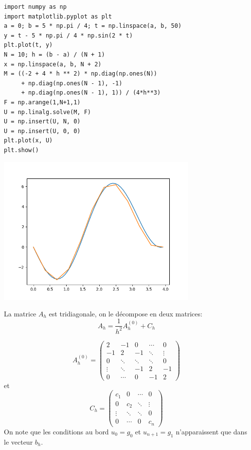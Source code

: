 \documentclass{beamer}
\begin{document}
 \begin{frame}[fragile] 
\begin{verbatim}
import numpy as np
import matplotlib.pyplot as plt
a = 0; b = 5 * np.pi / 4; t = np.linspace(a, b, 50)
y = t - 5 * np.pi / 4 * np.sin(2 * t)
plt.plot(t, y)
N = 10; h = (b - a) / (N + 1)
x = np.linspace(a, b, N + 2)
M = ((-2 + 4 * h ** 2) * np.diag(np.ones(N))
     + np.diag(np.ones(N - 1), -1)
     + np.diag(np.ones(N - 1), 1)) / (4*h**3)
F = np.arange(1,N+1,1)
U = np.linalg.solve(M, F)
U = np.insert(U, N, 0)
U = np.insert(U, 0, 0)
plt.plot(x, U)
plt.show()
\end{verbatim}
 
 \end{frame}
 
 \begin{frame} 
  \begin{center}
\includegraphics[width=10cm]{courbe2.png}
\end{center}
 \end{frame}
 
 
\begin{frame} 
La matrice $A_h$ est tridiagonale, on le décompose en deux matrices: 
\[A_h=\frac{1}{h^2} A_h^{(0)}+C_h\]

\[A_h^{(0)}=
\left(\begin{array}{ccccc}
2&-1&0&\cdots&0\\
-1&2&-1&\ddots&\vdots\\
0&  \ddots &\ddots&\ddots&0\\
\vdots &\ddots &-1&2&-1\\
   0&\cdots &0&-1 &2
\end{array}\right)
\] 
et
\[C_h=
\left(\begin{array}{cccc}
c_1&0&\cdots&0\\
0&c_2&\ddots&\vdots\\
  \vdots &\ddots&\ddots&0\\
   0&\cdots &0&c_n
\end{array}\right)
\]
On note que  les conditions au bord $u_0 = g_0$ et $u_{n+1} = g_1 $ n'apparaissent que dans le vecteur $b_h$.

  \end{frame}
  
\end{document}
